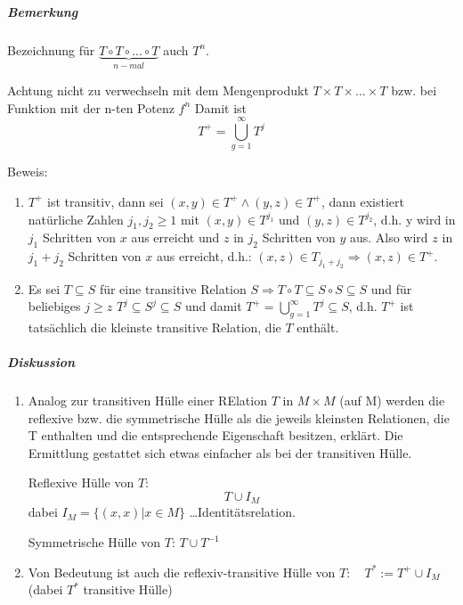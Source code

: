 \documentclass[a4paper]{scrartcl}
\begin{document}
\subparagraph{Bemerkung}
Bezeichnung für $\underbrace{T \circ T \circ ... \circ T}_{n-mal}$ auch $T^n$.

Achtung nicht zu verwechseln mit dem Mengenprodukt $T \times T\times ...\times T$ bzw. bei Funktion mit der n-ten Potenz $f^n$ Damit ist
\begin{equation*}
T^+ = \bigcup\limits_{g=1}^\infty T^j
\end{equation*}

Beweis:
\begin{enumerate}
\item $T^+$ ist transitiv, dann sei $(x,y) \in T^+ \wedge (y,z) \in T^+$, dann existiert natürliche Zahlen $j_1,j_2 \geq 1$ mit $(x,y) \in T^{j_1}$ und $(y,z) \in T^{j_2}$, d.h. y wird in $j_1$ Schritten von $x$ aus erreicht und $z$ in $j_2$ Schritten von $y$ aus.
Also wird $z$ in $j_1 + j_2$ Schritten von $x$ aus erreicht, d.h.:
$(x,z) \in T_{j_1 + j_2} \Rightarrow (x,z) \in T^+$.
\item Es sei $T \subseteq S$ für eine transitive Relation $S \Rightarrow T\circ T \subseteq S \circ S \subseteq S$ und für beliebiges $j \geq z$ \quad 
$ T^j \subseteq S^j \subseteq S$ und damit $T^+ = \bigcup\limits_{g=1}^{\infty} T^j \subseteq S$, d.h. $T^+$ ist tatsächlich die kleinste transitive Relation, die $T$ enthält.
\end{enumerate}
\subparagraph{Diskussion}
\begin{enumerate}
\item Analog zur transitiven Hülle einer RElation $T$ in $M \times M$ (auf M) werden die reflexive bzw. die symmetrische Hülle als die jeweils kleinsten Relationen, die T enthalten und die entsprechende Eigenschaft besitzen, erklärt. Die Ermittlung gestattet sich etwas einfacher als bei der transitiven Hülle.

Reflexive Hülle von $T$:
\[T\cup I_M\]
dabei $I_M =\{ (x,x) | x \in M\}$ \dots Identitätsrelation.

Symmetrische Hülle von $T$:
$T \cup T^{-1}$
\item Von Bedeutung ist auch die reflexiv-transitive Hülle von $T: \quad T^* := T^+ \cup I_M$
(dabei $T^*$ transitive Hülle)
\end{enumerate}
\end{document}
